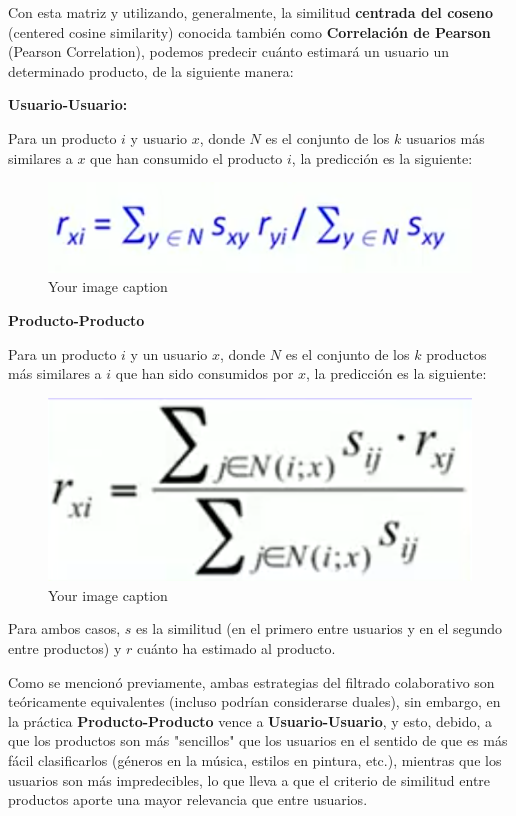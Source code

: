 \documentclass[14pt]{extarticle}
\begin{document}
Con esta matriz y utilizando, generalmente, la similitud \textbf{centrada del coseno} (centered cosine similarity) conocida también como \textbf{Correlación de Pearson} (Pearson Correlation), podemos predecir cuánto estimará un usuario un determinado producto, de la siguiente manera:

\textbf{Usuario-Usuario:}

Para un producto $i$ y usuario $x$, donde $N$ es el conjunto de los $k$ usuarios más similares a $x$ que han consumido el producto $i$, la predicción es la siguiente:

\begin{figure}[htbp]
    \centering
    \includegraphics[width=\textwidth]{./images/user_to_user.png}
    \caption{Your image caption}
    \label{fig:your-image-label}
\end{figure}

\textbf{Producto-Producto}

Para un producto $i$ y un usuario $x$, donde $N$ es el conjunto de los $k$ productos más similares a $i$ que han sido consumidos por $x$, la predicción es la siguiente:

\begin{figure}[htbp]
    \centering
    \includegraphics[width=\textwidth]{./images/item_to_item.png}
    \caption{Your image caption}
    \label{fig:your-image-label}
\end{figure}

Para ambos casos, $s$ es la similitud (en el primero entre usuarios y en el segundo entre productos) y $r$ cuánto ha estimado al producto.

Como se mencionó previamente, ambas estrategias del filtrado colaborativo son teóricamente equivalentes (incluso podrían considerarse duales), sin embargo, en la práctica \textbf{Producto-Producto} vence a \textbf{Usuario-Usuario}, y esto, debido, a que los productos son más "sencillos" que los usuarios en el sentido de que es más fácil clasificarlos (géneros en la música, estilos en pintura, etc.), mientras que los usuarios son más impredecibles, lo que lleva a que el criterio de similitud entre productos aporte una mayor relevancia que entre usuarios.
\end{document}
